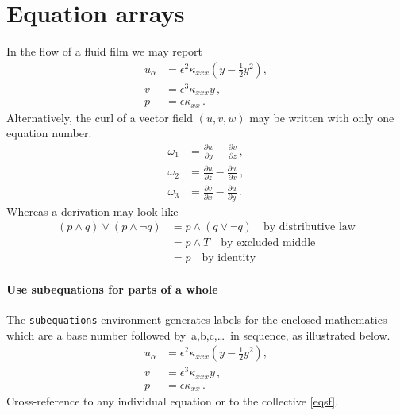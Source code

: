 \documentclass[20pt,a4paper]{extarticle}
\begin{document}
\section{Equation arrays}

In the flow of a fluid film we may report
\begin{align}
	u_\alpha & =  \epsilon^2 \kappa_{xxx} 
	\left( y-\frac{1}{2}y^2 \right),
	\label{equ}  \\
	v & =  \epsilon^3 \kappa_{xxx} y\,,
	\label{eqv}  \\
	p & =  \epsilon \kappa_{xx}\,.
	\label{eqp}
\end{align}
Alternatively, the curl of a vector field $(u,v,w)$ may be written 
with only one equation number:
\begin{align}
	\omega_1 & = 
	\frac{\partial w}{\partial y}-\frac{\partial v}{\partial z}\,,
	\nonumber  \\
	\omega_2 & =  
	\frac{\partial u}{\partial z}-\frac{\partial w}{\partial x}\,,
	\label{eqcurl}  \\
	\omega_3 & =  
	\frac{\partial v}{\partial x}-\frac{\partial u}{\partial y}\,.
	\nonumber
\end{align}
Whereas a derivation may look like
\begin{align*}
	(p\wedge q)\vee(p\wedge\neg q) & =  p\wedge(q\vee\neg q)
	\quad\text{by distributive law}  \\
	 & =  p\wedge T \quad\text{by excluded middle}  \\
	 & =  p \quad\text{by identity}
\end{align*}



\paragraph{Use subequations for parts of a whole}
The \verb|subequations| environment generates labels for the enclosed mathematics which are a base number followed by~a,b,c,\ldots\ in sequence, as illustrated below.
\begin{subequations}\label{eqsf}
\begin{align}
  u_\alpha & =  \epsilon^2 \kappa_{xxx} 
  \left( y-\frac{1}{2}y^2 \right),
  \label{equ2}  \\
  v & =  \epsilon^3 \kappa_{xxx} y\,,
  \label{eqv2}  \\
  p & =  \epsilon \kappa_{xx}\,.
  \label{eqp2}
\end{align}
\end{subequations}
Cross-reference to any individual equation or to the
collective \cref{eqsf}. 
\end{document}

